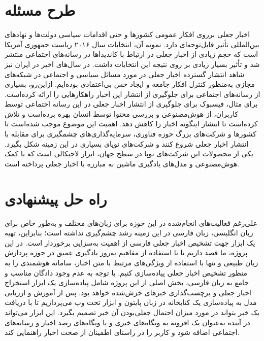 \section{طرح مسئله}
اخبار جعلی برروی افکار  عمومی کشورها و حتی اقدامات سیاسی دولت‌ها و نهادهای بین‌المللی تأثیر قابل‌توجه‌ای دارد. نمونه آن، انتخابات سال ۲۰۱۶  ریاست جمهوری آمریکا است که حجم زیادی از اخبار جعلی در ارتباط با کاندیداها در رسانه‌های اجتماعی منتشر شد و تأثیر بسیار  زیادی بر روی نتیجه این انتخابات داشت. در سال‌های اخیر در ایران نیز شاهد انتشار گسترده اخبار جعلی در مورد مسائل سیاسی  و اجتماعی در شبکه‌های مجازی به‌منظور کنترل افکار جامعه و ایجاد حس بی‌اعتمادی بوده‌ایم. ازاین‌رو، بسیاری از رسانه‌های اجتماعی برای جلوگیری از انتشار این اخبار راهکارهایی را ارائه کرده‌است. برای مثال، فیسبوک برای جلوگیری از انتشار اخبار  جعلی در این رسانه اجتماعی توسط کاربران، از هوش‌مصنوعی و بررسی محتوا توسط انسان بهره برده‌است و تلاش کرده‌است تا انتشار  اینگونه اخبار را کاهش دهد. اهمیت این موضوع موجب شده‌است تا کشورها و شرکت‌های بزرگ حوزه فناوری، سرمایه‌گذاری‌های چشمگیری برای مقابله با انتشار اخبار جعلی شروع کنند و شرکت‌های نوپای بسیاری در این زمینه شکل بگیرد. یکی از محصولات  این شرکت‌های نوپا در سطح جهان، ابزار لاجیکالی است که با کمک هوش‌مصنوعی و مدل‌های یادگیری ماشین به مبارزه با اخبار جعلی پرداخته است.

\section{راه حل پیشنهادی}
 علی‌رغم فعالیت‌های انجام‌شده در این حوزه برای زبان‌های مختلف و به‌طور خاص برای زبان انگلیسی، زبان فارسی در این زمینه رشد چشم‌گیری نداشته است؛ بنابراین، تهیه یک ابزار جهت تشخیص اخبار جعلی فارسی از اهمیت به‌سزایی برخوردار است. در این پروژه، ما قصد داریم تا با استفاده از مفاهیم به‌روز یادگیری عمیق در حوزه پردازش زبان طبیعی و تنها با استفاده از ویژگی‌های مرتبط با متن اخبار، سامانه‌ هوشمندی را به منظور تشخیص اخبار جعلی پیاده‌سازی کنیم. با توجه به عدم وجود دادگان مناسب و جامع به زبان فارسی، بخش اصلی از این پروژه شامل پیاده‌سازی یک ابزار استخراج اخبار جعلی و برچسب‌گذاری خبر‌های خزش‌شده خواهد بود. پس از آموزش و ارزیابی مدل به پیاده‌سازی یک کتابخانه در زبان پایتون و ابزار تحت وب می‌پردازیم تا با دریافت یک خبر بتواند در مورد میزان احتمال جعلی‌بودن آن خبر تصمیم بگیرد. این ابزار می‌تواند در آینده به‌عنوان یک افزونه به وبگاه‌های خبری و یا وبگاه‌های رصد اخبار و رسانه‌های اجتماعی اضافه شود و کاربر را در  راستای اطمینان از صحت اخبار راهنمایی کند.